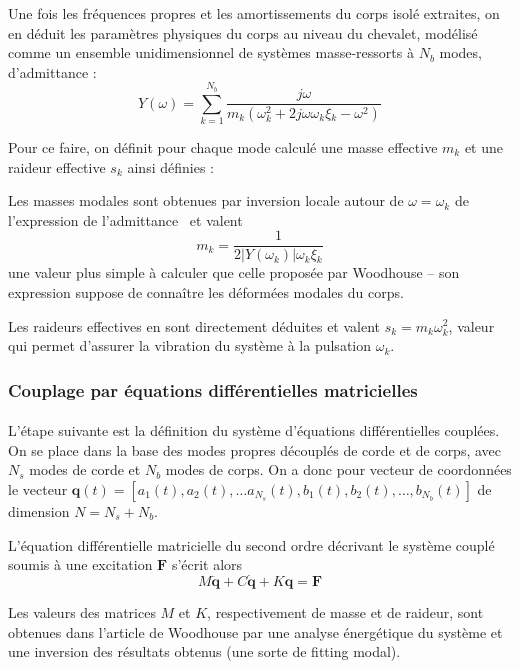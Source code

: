   Une fois les fréquences propres et les amortissements du corps isolé
extraites, on en déduit les paramètres physiques du corps au niveau du
chevalet, modélisé comme un ensemble unidimensionnel de systèmes masse-ressorts
à \( N_b \) modes, d'admittance :
  \[ Y(\omega) = \sum_{k=1}^{N_b} \frac{j\omega{}}
    {m_k(\omega_k^2 + 2 j \omega{} \omega{}_k \xi{}_k - \omega{}^2)} \]
    
Pour ce faire, on définit pour chaque mode calculé une masse effective
\( m_k \) et une raideur effective \( s_k \) ainsi définies :

  Les masses modales sont obtenues par inversion locale autour de
\( \omega = \omega_k \) de l'expression de l'admittance~\cite{pate14:phd} et
valent \[ m_k = \frac{1}{2 |Y(\omega_k)| \omega{}_k \xi{}_k} \] une valeur plus
simple à calculer que celle proposée par Woodhouse -- son expression suppose de
connaître les déformées modales du corps.

  Les raideurs effectives en sont directement déduites et valent
\( s_k = m_k \omega{}_k^2 \), valeur qui permet d'assurer la vibration du système
à la pulsation \( \omega{}_k \).

\subsubsection{Couplage par équations différentielles matricielles}

  \paragraph{}
  L'étape suivante est la définition du système d'équations différentielles
cou\-plées. On se place dans la base des modes propres découplés de corde et de corps,
avec \( N_s \) modes de corde et \( N_b \) modes de corps. On a donc
pour vecteur de coordonnées le vecteur
  \( \bm{q}(t) = [a_1(t), a_2(t), \dots a_{N_s}(t),
    b_1(t), b_2(t), \dots, b_{N_b}(t)] \) de dimension
\( N = N_s + N_b \).

  L'équation différentielle matricielle du second ordre décrivant le système
couplé soumis à une excitation \( \bm{F} \) s'écrit alors
  \[ \label{eq:diff_second}
    M \ddot{\bm{q}} + C \dot{\bm{q}} + K \bm{q} = \bm{F} \]

  Les valeurs des matrices \( M \) et \( K \), respectivement de masse et de
raideur, sont obtenues dans l'article de Woodhouse par une analyse énergétique
du système et une inversion des résultats obtenus (une sorte de fitting
modal).

